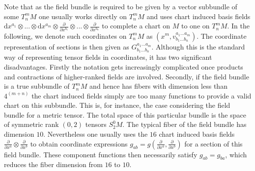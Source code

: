 \documentclass[a4paper,12pt, DIV=14, BCOR=5mm, twoside, headsepline, numbers=noenddot]{scrbook}
\begin{document}
Note that as the field bundle is required to be given by a vector subbundle of some $T^m_n M$ one usually works directly on $T^m_n M$ and uses chart induced basis fields $\mathrm{d}x^{a_1}\otimes ... \otimes \mathrm{d}x^{a_m} \otimes \frac{\partial}{\partial x^{b_1}} \otimes ... \otimes \frac{\partial}{\partial x^{b_n}}$ to complete a chart on $M$ to one on $T ^m _ n M$. In the following, we denote such coordinates on $T^m_n M$ as $(x^m, v^{a_1 ... a_m}_{b_1 ... b_n})$. The coordinate representation of sections is then given as $G^{a_1 ... a_m}_{b_1 ... b_n}$. Although this is the standard way of representing tensor fields in coordinates, it has two significant disadvantages. Firstly the notation gets increasingly complicated once products and contractions of higher-ranked fields are involved. Secondly, if the field bundle is a true subbundle of $T^m_nM$ and hence has fibers with dimension less than $4^{(m+n)}$ the chart induced fields simply are too many functions to provide a valid chart on this subbundle. This is, for instance, the case considering the field bundle for a metric tensor. The total space of this particular bundle is the space of symmetric rank $(0,2)$ tensors $S^0_2M$. The typical fiber of the field bundle has dimension $10$. Nevertheless one usually uses the $16$ chart induced basis fields $ \frac{\partial}{\partial x^a}  \otimes \frac{\partial}{\partial x^b}$ to obtain coordinate expressions $g_{ab} = g(\frac{\partial}{\partial x^a},\frac{\partial}{\partial x^b})$ for a section of this field bundle. These component functions then necessarily satisfy $g_{ab} = g_{ba}$, which reduces the fiber dimension from $16$ to $10$. 
\end{document}
